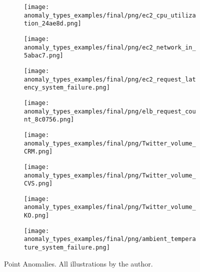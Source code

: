 \begin{figure}[htp!]
    \centering
    \begin{subfigure}[t]{.49\linewidth}
        \centering
        \texttt{[image: anomaly\_types\_examples/final/png/ec2\_cpu\_utilization\_24ae8d.png]}
        \label{app-fig:ec2_cpu_utilization_24ae8d}
    \end{subfigure}
    \begin{subfigure}[t]{.49\linewidth}
        \centering
        \texttt{[image: anomaly\_types\_examples/final/png/ec2\_network\_in\_5abac7.png]}
        \label{app-fig:ec2_network_in_5abac7}
    \end{subfigure}
    \begin{subfigure}[t]{.49\linewidth}
        \centering
        \texttt{[image: anomaly\_types\_examples/final/png/ec2\_request\_latency\_system\_failure.png]}
        \label{app-fig:ec2_request_latency_system_failure}
    \end{subfigure}
    \begin{subfigure}[t]{.49\linewidth}
        \centering
        \texttt{[image: anomaly\_types\_examples/final/png/elb\_request\_count\_8c0756.png]}
        \label{app-fig:elb_request_count_8c0756}
    \end{subfigure}
    \begin{subfigure}[t]{.49\linewidth}
        \centering
        \texttt{[image: anomaly\_types\_examples/final/png/Twitter\_volume\_CRM.png]}
        \label{app-fig:Twitter_volume_CRM}
    \end{subfigure}
    \begin{subfigure}[t]{.49\linewidth}
        \centering
        \texttt{[image: anomaly\_types\_examples/final/png/Twitter\_volume\_CVS.png]}
        \label{app-fig:Twitter_volume_CVS}
    \end{subfigure}
    \begin{subfigure}[t]{.49\linewidth}
        \centering
        \texttt{[image: anomaly\_types\_examples/final/png/Twitter\_volume\_KO.png]}
        \label{app-fig:Twitter_volume_KO}
    \end{subfigure}
    \begin{subfigure}[t]{.49\linewidth}
        \centering
        \texttt{[image: anomaly\_types\_examples/final/png/ambient\_temperature\_system\_failure.png]}
        \label{app-fig:ambient_temperature_system_failure}
    \end{subfigure}
    \caption{Point Anomalies. All illustrations by the author.}\label{fig:spiking-types}
\end{figure}\clearpage



